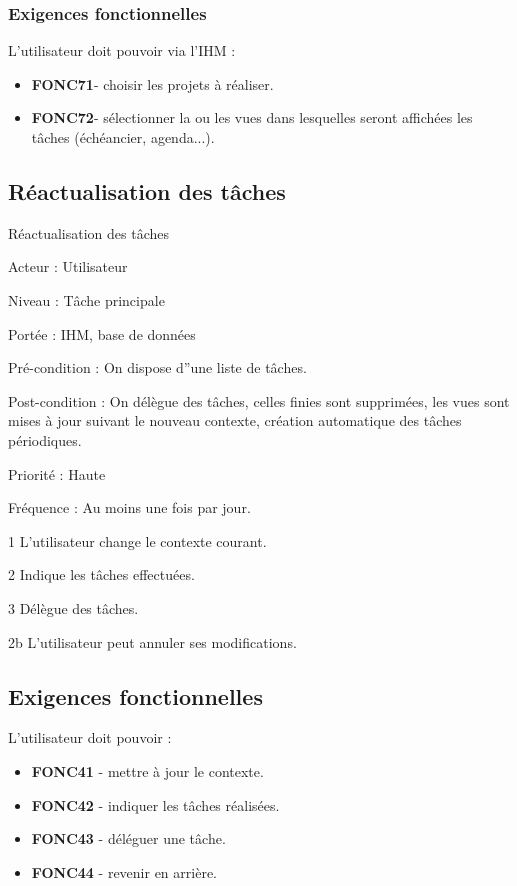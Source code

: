 	\subsubsection{Exigences fonctionnelles}
		L'utilisateur doit pouvoir via l'IHM :
		\begin{itemize}	\renewcommand{\labelitemi}{}
			\item \textbf{FONC71}- choisir les projets à réaliser.
			\item \textbf{FONC72}- sélectionner la ou les vues dans lesquelles seront affichées les tâches (échéancier, agenda...).
		\end{itemize}
		
\subsection{Réactualisation des tâches}
	\begin{usecase}{Réactualisation des tâches} 
		\begin{information}
			\item[Acteur :] Utilisateur
			\item[Niveau :] Tâche principale
			\item[Portée :] IHM, base de données
			\item[Pré-condition :] On dispose d''une liste de tâches.
			\item[Post-condition :] On délègue des tâches, celles finies sont supprimées, les vues sont mises à jour suivant le nouveau contexte, création automatique des tâches périodiques.
			\item[Priorité :] Haute
			\item[Fréquence :] Au moins une fois par jour.
		\end{information}
		\begin{scenario}
			\item[1] L'utilisateur change le contexte courant.
			\item[2] Indique les tâches effectuées.
			\item[3] Délègue des tâches.
		\end{scenario}
		\begin{extension}
			\item[2b] L'utilisateur peut annuler ses modifications.
		\end{extension}
	\end{usecase}
		
	
	\subsection{Exigences fonctionnelles}
		L'utilisateur doit pouvoir :
		\begin{itemize}	\renewcommand{\labelitemi}{}
			\item \textbf{FONC41} - mettre à jour le contexte.
			\item \textbf{FONC42} - indiquer les tâches réalisées.
			\item \textbf{FONC43} - déléguer une tâche.
			\item \textbf{FONC44} - revenir en arrière.
		\end{itemize}

